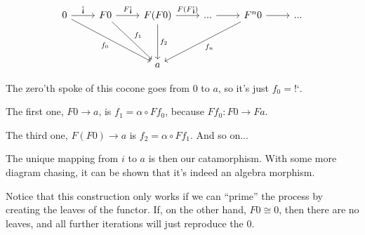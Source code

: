 \documentclass[DaoFP]{subfiles}
\begin{document}
\[
 \begin{tikzcd}
 0
 \arrow[r, "\mbox{!`}"]
 \arrow[ddrr, "f_0"']
 & F 0
  \arrow[r, "F\mbox{!`}"]
 \arrow[ddr, "f_1"]
& F (F 0)
  \arrow[r, "F(F\mbox{!`})"]
  \arrow[dd, "f_2"]
 & ...
 \arrow[r]
 & F^n 0
  \arrow[r]
 \arrow[ddll, "f_n"]
 & ...
 \\
 \\
 &&a
  \end{tikzcd}
\]


The zero'th spoke of this cocone goes from $0$ to $a$, so it's just $f_0 = \mbox{!`}$.

The first one, $F 0 \to a$, is $f_1 = \alpha \circ F f_0$, because $F f_0 \colon F 0 \to F a$.

The third one, $F (F 0) \to a$ is  $f_2 = \alpha \circ F f_1$.  And so on...

The unique mapping from $i$ to $a$ is then our catamorphism. With some more diagram chasing, it can be shown that it's indeed an algebra morphism. 

Notice that this construction only works if we can ``prime'' the process by creating the leaves of the functor. If, on the other hand, $F 0 \cong 0$, then there are no leaves, and all further iterations will just reproduce the $0$. 
\end{document}
